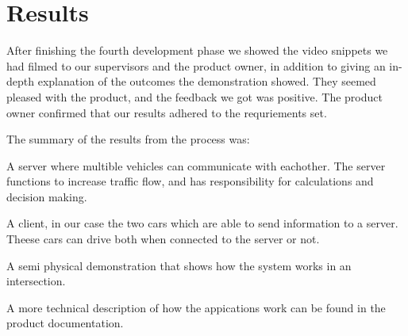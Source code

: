 \section{Results}
After finishing the fourth development phase we showed the video snippets we had filmed to our supervisors and the product owner, in addition to giving an in-depth explanation of the outcomes the demonstration showed. They seemed pleased with the product, and the feedback we got was positive. The product owner confirmed that our results adhered to the requriements set.

The summary of the results from the process was:

A server where multible vehicles can communicate with eachother. The server functions to increase traffic flow, and has responsibility for calculations and decision making. 

A client, in our case the two cars which are able to send information to a server. Theese cars can drive both when connected to the server or not.

A semi physical demonstration that shows how the system works in an intersection.

A more technical description of how the appications work can be found in the product documentation. 





